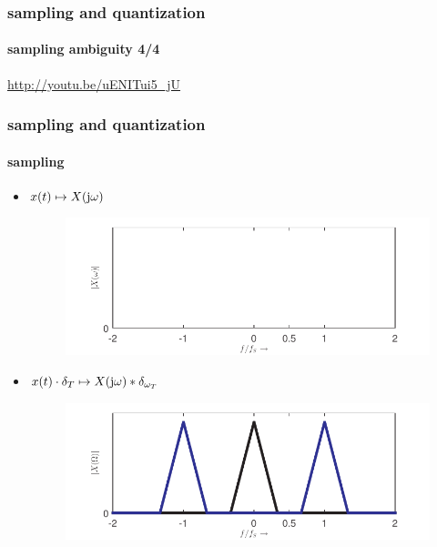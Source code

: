 		\begin{frame}\frametitle{sampling and quantization}\framesubtitle{sampling ambiguity 4/4}
			\url{http://youtu.be/uENITui5_jU}
		\end{frame}	
        
        
		\begin{frame}\frametitle{sampling and quantization}\framesubtitle{sampling}
            \begin{itemize}
				\item[]	$x(t) \mapsto X(\mathrm{j}\omega)$
					\vspace{-6mm}
					\uncover<1->
                    {\begin{figure}
						\flushright
							\includegraphics[scale=.4]{Graph/spectrum_sampling_1}
					\end{figure}
				}
                \pause
				\item[]	$x(t)\cdot \delta_T \mapsto X(\mathrm{j}\omega)\ast \delta_{\omega_T}$
					\vspace{-6mm}
					\uncover<2->
                    {\begin{figure}
						\flushright
							\includegraphics[scale=.4]{Graph/spectrum_sampling_2}
					\end{figure}
                    }
			\end{itemize}		
		\end{frame}
		
